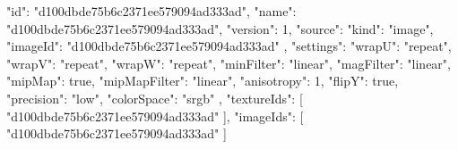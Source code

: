 {
  "id": "d100dbde75b6c2371ee579094ad333ad",
  "name": "d100dbde75b6c2371ee579094ad333ad",
  "version": 1,
  "source": {
    "kind": "image",
    "imageId": "d100dbde75b6c2371ee579094ad333ad"
  },
  "settings": {
    "wrapU": "repeat",
    "wrapV": "repeat",
    "wrapW": "repeat",
    "minFilter": "linear",
    "magFilter": "linear",
    "mipMap": true,
    "mipMapFilter": "linear",
    "anisotropy": 1,
    "flipY": true,
    "precision": "low",
    "colorSpace": "srgb"
  },
  "textureIds": [
    "d100dbde75b6c2371ee579094ad333ad"
  ],
  "imageIds": [
    "d100dbde75b6c2371ee579094ad333ad"
  ]
}
